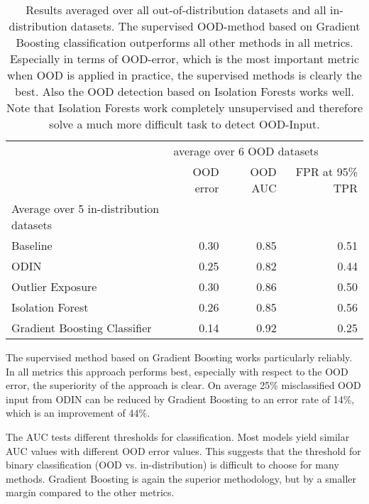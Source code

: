 \documentclass{article}
\begin{document}
\begin{table}
\centering
\caption{Results averaged over all out-of-distribution datasets and all in-distribution datasets. The supervised OOD-method based on Gradient Boosting classification outperforms all other methods in all metrics. Especially in terms of OOD-error, which is the most important metric when OOD is applied in practice, the supervised methods is clearly the best. Also the OOD detection based on Isolation Forests works well. Note that Isolation Forests work completely unsupervised and therefore solve a much more difficult task to detect OOD-Input.}
\label{allAvgOODResult}
\begin{tabular}{lrrr}
\toprule
{} & \multicolumn{3}{l}{average over 6 OOD datasets} \\
{} &                   OOD error & OOD AUC & FPR at 95\% TPR \\
Average over 5 in-distribution datasets &                             &         &                \\
\midrule
Baseline                                &                        0.30 &    0.85 &           0.51 \\
ODIN                                    &                        0.25 &    0.82 &           0.44 \\
Outlier Exposure                        &                        0.30 &    0.86 &           0.50 \\
Isolation Forest                        &                        0.26 &    0.85 &           0.56 \\
Gradient Boosting Classifier            &                        0.14 &    0.92 &           0.25 \\
\bottomrule
\end{tabular}
\end{table}
 
The supervised method based on Gradient Boosting works particularly reliably. In all metrics this approach performs best, especially with respect to the OOD error, the superiority of the approach is clear. On average 25\% misclassified OOD input from ODIN can be reduced by Gradient Boosting to an error rate of 14\%, which is an improvement of 44\%.

The AUC tests different thresholds for classification. Most models yield similar AUC values with different OOD error values. This suggests that the threshold for binary classification (OOD vs. in-distribution) is difficult to choose for many methods. Gradient Boosting is again the superior methodology, but by a smaller margin compared to the other metrics.
\end{document}
